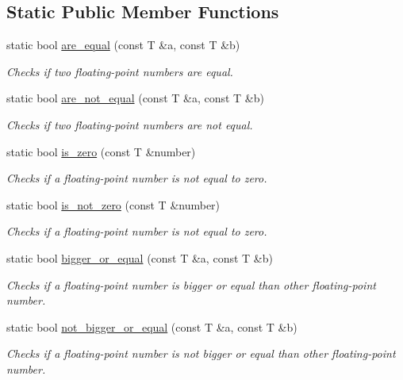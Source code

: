 \subsection*{Static Public Member Functions}
\begin{DoxyCompactItemize}
\item 
static bool \hyperlink{structdl32_floating_point_helper_af654a94da92d04c2ff67418c5d7472de}{are\-\_\-equal} (const T \&a, const T \&b)
\begin{DoxyCompactList}\small\item\em Checks if two floating-\/point numbers are equal. \end{DoxyCompactList}\item 
static bool \hyperlink{structdl32_floating_point_helper_acbb88230afd4cb6e9f8e02824428e19c}{are\-\_\-not\-\_\-equal} (const T \&a, const T \&b)
\begin{DoxyCompactList}\small\item\em Checks if two floating-\/point numbers are not equal. \end{DoxyCompactList}\item 
static bool \hyperlink{structdl32_floating_point_helper_aeaa1eab42c4acc218f31a19539888351}{is\-\_\-zero} (const T \&number)
\begin{DoxyCompactList}\small\item\em Checks if a floating-\/point number is not equal to zero. \end{DoxyCompactList}\item 
static bool \hyperlink{structdl32_floating_point_helper_a676a85c34e2c9569f2da8f50686d7ee9}{is\-\_\-not\-\_\-zero} (const T \&number)
\begin{DoxyCompactList}\small\item\em Checks if a floating-\/point number is not equal to zero. \end{DoxyCompactList}\item 
static bool \hyperlink{structdl32_floating_point_helper_a1947178511c75425e9507d5fed95ee3d}{bigger\-\_\-or\-\_\-equal} (const T \&a, const T \&b)
\begin{DoxyCompactList}\small\item\em Checks if a floating-\/point number is bigger or equal than other floating-\/point number. \end{DoxyCompactList}\item 
static bool \hyperlink{structdl32_floating_point_helper_a154a42a8391f27105b663b242a2d5946}{not\-\_\-bigger\-\_\-or\-\_\-equal} (const T \&a, const T \&b)
\begin{DoxyCompactList}\small\item\em Checks if a floating-\/point number is not bigger or equal than other floating-\/point number. \end{DoxyCompactList}\item 

\end{DoxyCompactItemize}

